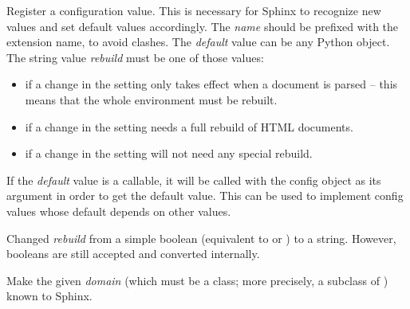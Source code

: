\documentclass[letterpaper,10pt,english]{sphinxmanual}
\begin{document}
\begin{fulllineitems}
\label{ext/appapi:sphinx.application.Sphinx.add_config_value}
Register a configuration value.  This is necessary for Sphinx to recognize
new values and set default values accordingly.  The \emph{name} should be prefixed
with the extension name, to avoid clashes.  The \emph{default} value can be any
Python object.  The string value \emph{rebuild} must be one of those values:
\begin{itemize}
\item {} 
 if a change in the setting only takes effect when a document is
parsed -- this means that the whole environment must be rebuilt.

\item {} 
 if a change in the setting needs a full rebuild of HTML
documents.

\item {} 
 if a change in the setting will not need any special rebuild.

\end{itemize}

If the \emph{default} value is a callable, it will be called with the config
object as its argument in order to get the default value.  This can be
used to implement config values whose default depends on other values.

Changed \emph{rebuild} from a simple boolean (equivalent to  or
) to a string.  However, booleans are still accepted and
converted internally.

\end{fulllineitems}


\begin{fulllineitems}
\label{ext/appapi:sphinx.application.Sphinx.add_domain}
Make the given \emph{domain} (which must be a class; more precisely, a subclass of
) known to Sphinx.


\end{fulllineitems}

\end{document}
